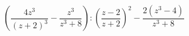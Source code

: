 \begin{ex}[type=expression]
	\begin{condition}
		\( \left( \dfrac{4z^3}{(z+2)^3}-\dfrac{z^3}{z^3+8} \right) :\left( \dfrac{z-2}{z+2} \right)^2-\dfrac{2(z^3-4)}{z^3+8}\)
	\end{condition}
\end{ex}